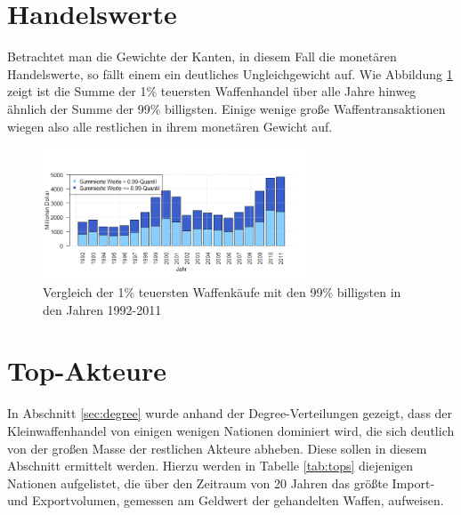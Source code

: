 \documentclass[a4paper,ngerman,oneside,titlepage,bibliography=totoc,11pt]{scrreprt}
\begin{document}
\section{Handelswerte}


Betrachtet man die Gewichte der Kanten, in diesem Fall die monetären Handelswerte, so fällt einem ein deutliches Ungleichgewicht auf. Wie Abbildung \ref{fig:ts_value} zeigt ist die Summe der 1\% teuersten Waffenhandel über alle Jahre hinweg ähnlich der Summe der 99\% billigsten. Einige wenige große Waffentransaktionen wiegen also alle restlichen in ihrem monetären Gewicht auf. 
\begin{figure}[ht]
	\centering
		\includegraphics[width=0.7\textwidth]{Grafiken/ts_value.png}
	\caption{Vergleich der 1\% teuersten Waffenkäufe mit den 99\% billigsten in den Jahren 1992-2011}
	\label{fig:ts_value}
\end{figure}

\section{Top-Akteure}
\label{sec:top-akteure}
In Abschnitt \ref{sec:degree} wurde anhand der Degree-Verteilungen gezeigt, dass der Kleinwaffenhandel von einigen wenigen Nationen dominiert wird, die sich deutlich von der großen Masse der restlichen Akteure abheben. Diese sollen in diesem Abschnitt ermittelt werden. Hierzu werden in Tabelle \ref{tab:tops} diejenigen Nationen aufgelistet, die über den Zeitraum von 20 Jahren das größte Import- und Exportvolumen, gemessen am Geldwert der gehandelten Waffen, aufweisen. 
\end{document}
